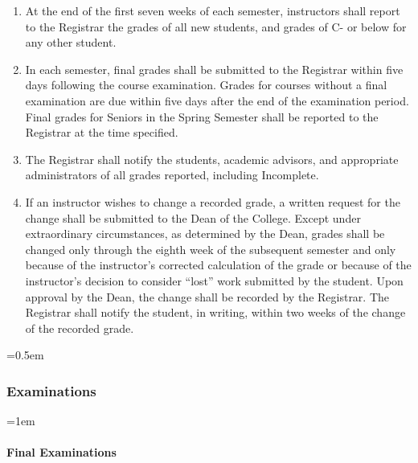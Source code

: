 \documentclass{manual}
\let\oldsubsubsection\subsubsection
\renewcommand\subsubsection{\leftskip=0.5em\oldsubsubsection}
\let\oldparagraph\paragraph
\renewcommand\paragraph{\leftskip=1em\oldparagraph}
\newcommand{\itemLevelA}{\alph*.}
\newcommand{\itemLevelB}{\arabic*)}
\newcommand{\itemRefA}{\alph*}
\newcommand{\itemRefB}{\arabic*}
\begin{document}
\begin{enumerate}[label=\itemLevelA,ref=\itemRefA]
		\begin{enumerate}[label=\itemLevelB,ref=\itemRefB]
		\item At the end of the first seven weeks of each semester, instructors shall report to the Registrar the grades of all new students, and grades of C- or below for any other student.
		\item  In each semester, final grades shall be submitted  to the Registrar within five days following the course examination. Grades for courses without a final examination are due within five days after the end of the examination period. Final grades for Seniors in the Spring Semester shall be reported to the Registrar at the time specified.
		\item  The Registrar shall notify the students, academic advisors, and appropriate administrators of all grades reported, including Incomplete. 
		\item  If an instructor wishes to change a recorded grade,  a written request for the change shall be submitted to the Dean of the College. Except under extraordinary circumstances, as determined by the Dean, grades shall be changed only through the eighth week of the subsequent semester and only because of the instructor's corrected calculation of the grade or because of the instructor's decision to consider ``lost'' work submitted by the student. Upon approval by the Dean, the change shall be recorded by the Registrar. The Registrar shall notify the student, in writing, within two weeks of the change of the recorded grade.
		\end{enumerate}
	
	\end{enumerate}

\subsubsection{Examinations}

\paragraph{Final Examinations}
\end{document}
